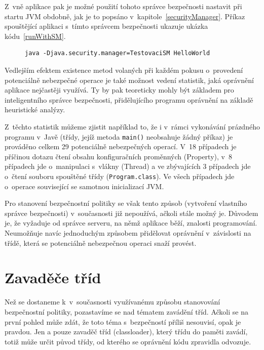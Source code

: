 Z~vně aplikace pak je možné použití tohoto správce bezpečnosti nastavit při startu JVM obdobně, jak je to popsáno v~kapitole~\ref{securityManager}. Příkaz spouštějící aplikaci s~tímto správcem bezpečnosti ukazuje ukázka kódu~\ref{runWithSM}.

\begin{figure}[tbh]
\begin{lstlisting}[caption=Spuštění aplikace s~vlastním správcem bezpečnosti, label=runWithSM]
java -Djava.security.manager=TestovaciSM HelloWorld
\end{lstlisting}
\end{figure}

Vedlejším efektem existence metod volaných při každém pokusu o~provedení potenciálně nebezpečné operace je také možnost vedení statistik, jaká oprávnění
aplikace nejčastěji využívá. Ty by pak teoreticky mohly být základem pro inteligentního správce bezpečnosti, přidělujícího programu oprávnění
na základě heuristické analýzy.

Z~těchto statistik můžeme zjistit například to, že i v~rámci vykonávání prázdného programu v~Javě (třídy, jejíž metoda {\tt main()} neobsahuje žádný příkaz) je prováděno celkem 29 potenciálně nebezpečných operací.
V~18 případech je příčinou dotazu čtení obsahu konfiguračních proměnných (Property), v~8 případech jde o~manipulaci s~vlákny (Thread) a ve zbývajících 3 případech jde o~čtení souboru spouštěné třídy ({\tt Program.class}). Ve všech případech jde o~operace související se samotnou inicializací JVM.

Pro stanovení bezpečnostní politiky se však tento způsob (vytvoření vlastního správce bezpečnosti) v~současnosti již nepoužívá, ačkoli stále možný je.
Důvodem je, že vyžaduje od správce serveru, na němž aplikace běží, znalosti programování.
Neumožňuje navíc jednoduchým způsobem přidělovat oprávnění v~závislosti na třídě, která se potenciálně nebezpečnou operaci snaží provést.

\section{Zavaděče tříd} \label{classloader}

Než se dostaneme k~v~současnosti využívanému způsobu stanovování bezpečnostní politiky, pozastavíme se nad tématem zavádění tříd.
Ačkoli se na první pohled může zdát, že toto téma s~bezpečností příliš nesouvisí, opak je pravdou.
Jen a pouze zavaděč tříd (classloader), který třídu do paměti zavádí, totiž může určit původ třídy, od kterého se oprávnění kódu zpravidla odvozuje.

